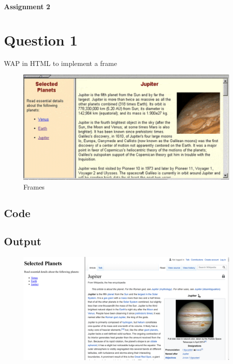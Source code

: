 \documentclass{article}
\begin{document}
\centerline{\bfseries \Huge Assignment 2}

\section*{Question 1}

WAP in HTML to implement a frame

\begin{figure}[H]
  \caption{Frames}
  \centering
  \includegraphics[width=14cm]{./img/1.png}
\end{figure}

\newpage
\subsection*{Code}


\newpage
\subsection*{Output}
\begin{figure}[H]
  \centering
  \includegraphics[width=16cm]{1/out.png}
\end{figure}
\end{document}
